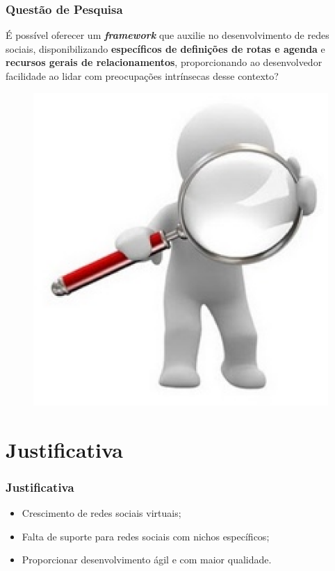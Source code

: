 \documentclass{beamer}
\begin{document}
\begin{frame}
\frametitle{Questão de Pesquisa}

É possível oferecer um \textbf{\textit{framework}} que auxilie no desenvolvimento de redes sociais, disponibilizando \textbf{específicos de definições de rotas e agenda} e \textbf{recursos gerais de relacionamentos}, proporcionando ao desenvolvedor facilidade ao lidar com preocupações intrínsecas desse contexto?

\begin{figure}[h]
	\centering
	\includegraphics[scale=0.15]{figuras/search.eps}
\end{figure}

\end{frame}

\section{Justificativa}

\begin{frame}
\frametitle{Justificativa}

\begin{itemize}
	\item Crescimento de redes sociais virtuais;
	\item Falta de suporte para redes sociais com nichos específicos;
	\item Proporcionar desenvolvimento ágil e com maior qualidade.
\end{itemize}

\end{frame}
\end{document}
